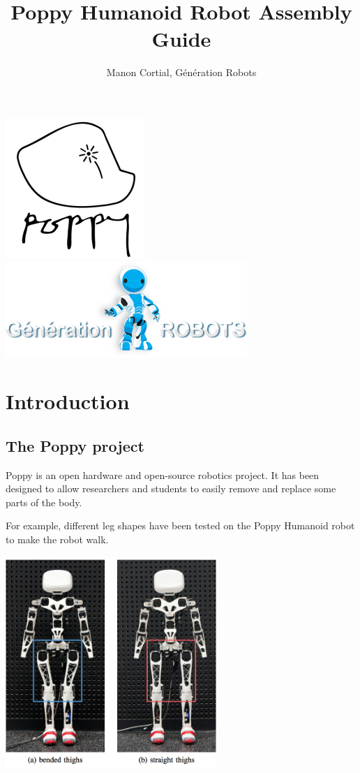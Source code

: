 \documentclass[includefoot]{article}
\begin{document}
\title{Poppy Humanoid Robot Assembly Guide}
\author{Manon Cortial, Génération Robots}

\maketitle

  \includegraphics[height=0.22\textwidth]{img/poppy-logo} \hfill \includegraphics[height=0.22\textwidth]{img/GR-logo}

  \tableofcontents


\section{Introduction}

\subsection{The Poppy project}

Poppy is an open hardware and open-source robotics project. It has been designed to allow researchers and students to easily remove and replace some parts of the body. 

For example, different leg shapes have been tested on the Poppy Humanoid robot to make the robot walk.

 \begin{center}
  \includegraphics[width=0.6\textwidth]{img/humanoids2013_Experiments}
 \end{center}
\end{document}
